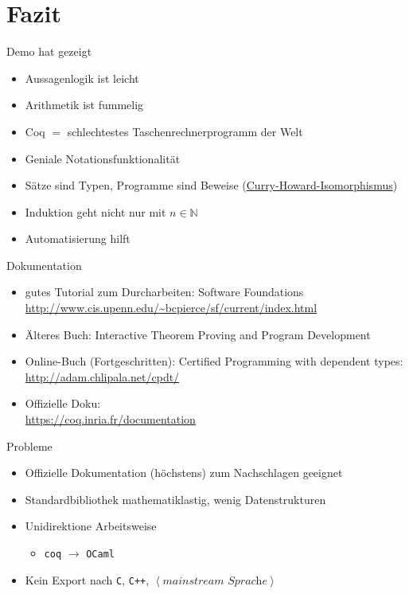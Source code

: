 \documentclass[aspectratio=169]{beamer}
\begin{document}
\section{Fazit}
\begin{frame}
  \begin{center}
    \Large{Demo hat gezeigt}
  \end{center}
  \begin{itemize}
  \item Aussagenlogik ist leicht
  \item Arithmetik ist fummelig
  \item Coq $=$ schlechtestes Taschenrechnerprogramm der Welt
  \item Geniale Notationsfunktionalität
  \item Sätze sind Typen, Programme sind Beweise (\href{https://de.wikipedia.org/wiki/Curry-Howard-Isomorphismus}{Curry-Howard-Isomorphismus})
  \item Induktion geht nicht nur mit $n\in\mathbb{N}$
  \item Automatisierung hilft
  \end{itemize}
\end{frame}
\begin{frame}
  \begin{center}
    \Large{Dokumentation}
  \end{center}
  \begin{itemize}
  \item gutes Tutorial zum Durcharbeiten: Software Foundations\\
    \qquad \url{http://www.cis.upenn.edu/~bcpierce/sf/current/index.html}
  \item Älteres Buch: Interactive Theorem Proving and Program Development
  \item Online-Buch (Fortgeschritten): Certified Programming with dependent types:\\
    \qquad \url{http://adam.chlipala.net/cpdt/}
  \item Offizielle Doku:\\
    \qquad \url{https://coq.inria.fr/documentation}
  \end{itemize}
\end{frame}
\begin{frame}
  \begin{center}
    \Large{Probleme}
  \end{center}
  \begin{itemize}
  \item Offizielle Dokumentation (höchstens) zum Nachschlagen geeignet
  \item Standardbibliothek mathematiklastig, wenig Datenstrukturen
  \item Unidirektione Arbeitsweise 
    \begin{itemize}
    \item \texttt{coq} $\longrightarrow$ \texttt{OCaml}
    \end{itemize}
  \item Kein Export nach \texttt{C}, \texttt{C++}, $\left<\textit{mainstream Sprache}\right>$
  \end{itemize}
\end{frame} %
\end{document}
